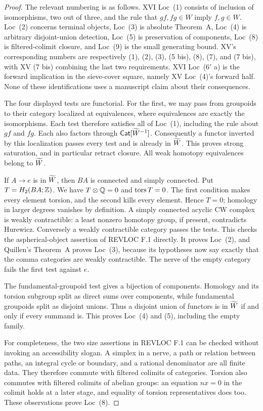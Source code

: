 \begin{proof}
The relevant numbering is as follows.  XVI Loc~(1) consists of inclusion
of isomorphisms, two out of three, and the rule that $gf,fg\in W$ imply
$f,g\in W$.  Loc~(2) concerns terminal objects, Loc~(3) is absolute
Theorem~A, Loc~(4) is arbitrary disjoint-union detection, Loc~(5) is
preservation of components, Loc~(8) is filtered-colimit closure, and
Loc~(9) is the small generating bound.  XV's corresponding numbers are
respectively (1), (2), (3), (5 bis), (8), (7), and (7 bis), with XV
(7 bis) combining the last two requirements.  XVI Loc~($6'$ a) is the
forward implication in the sieve-cover square, namely XV Loc~(4)'s
forward half.  None of these identifications uses a manuscript claim
about their consequences.

The four displayed tests are functorial.  For the first, we may pass
from groupoids to their category localized at equivalences, where
equivalences are exactly the isomorphisms.  Each test therefore satisfies
all of Loc~(1), including the rule about $gf$ and $fg$.  Each also
factors through $\mathsf{Cat}[\widetilde W^{-1}]$.  Consequently a functor inverted by
this localization passes every test and is already in $\widetilde W$.  This
proves strong saturation, and in particular retract closure.  All weak
homotopy equivalences belong to $\widetilde W$.

If $A\to e$ is in $\widetilde W$, then $BA$ is connected and simply connected.
Put $T=H_2(BA;\mathbb Z)$.  We have $T\otimes\mathbb Q=0$ and $\operatorname{tors} T=0$.
The first condition makes every element torsion, and the second kills
every element.  Hence $T=0$; homology in larger degrees vanishes by
definition.  A simply connected acyclic CW complex is weakly
contractible: a least nonzero homotopy group, if present, contradicts
Hurewicz.  Conversely a weakly contractible category passes the tests.
This checks the aspherical-object assertion of REVLOC F.1 directly.
It proves Loc~(2), and Quillen's Theorem~A
\cite[\S1, Theorem A]{GQuillen1973} proves Loc~(3), because its
hypotheses now say exactly that the comma categories are weakly
contractible.  The nerve of the empty category fails the first test
against $e$.

The fundamental-groupoid test gives a bijection of components.  Homology
and its torsion subgroup split as direct sums over components, while
fundamental groupoids split as disjoint unions.  Thus a disjoint union
of functors is in $\widetilde W$ if and only if every summand is.  This proves
Loc~(4) and (5), including the empty family.

For completeness, the two size assertions in REVLOC F.1 can be checked
without invoking an accessibility slogan.  A simplex in a nerve, a
path or relation between paths, an integral cycle or boundary, and a
rational denominator are all finite data.  They therefore commute with
filtered colimits of categories.  Torsion also commutes with filtered
colimits of abelian groups: an equation $nx=0$ in the colimit holds
at a later stage, and equality of torsion representatives does too.
These observations prove Loc~(8).


\end{proof}
